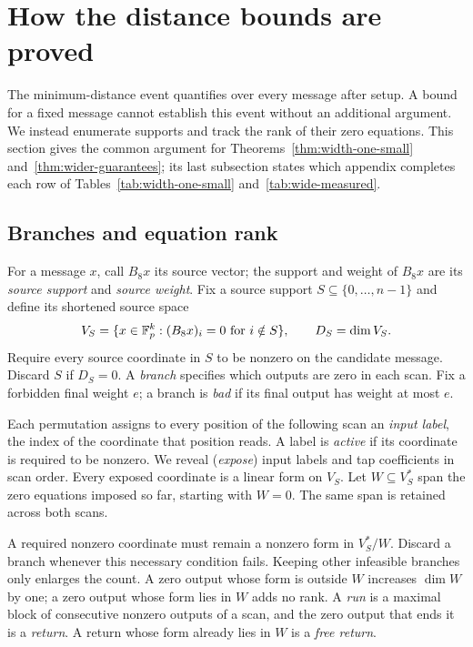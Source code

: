 \section{How the distance bounds are proved}\label{sec:distance-proof}

The minimum-distance event quantifies over every message after setup.
A bound for a fixed message cannot establish this event without an
additional argument. We instead enumerate supports and track the rank
of their zero equations. This section gives the common argument for
Theorems~\ref{thm:width-one-small} and~\ref{thm:wider-guarantees}; its
last subsection states which appendix completes each row of
Tables~\ref{tab:width-one-small} and~\ref{tab:wide-measured}.

\subsection{Branches and equation rank}

For a message $x$, call $B_8x$ its source vector; the support and weight
of $B_8x$ are its \emph{source support} and \emph{source weight}.
Fix a source support $S\subseteq\{0,\ldots,n-1\}$ and define its
shortened source space
\[
 V_S=\{x\in\mathbb F_p^k:(B_8x)_i=0\text{ for }i\notin S\},
 \qquad D_S=\dim V_S.
\]
Require every source coordinate in $S$ to be nonzero on the candidate
message. Discard $S$ if $D_S=0$. A \emph{branch} specifies which outputs
are zero in each scan. Fix a forbidden final weight $e$; a branch is
\emph{bad} if its final output has weight at most $e$.

Each permutation assigns to every position of the following scan an
\emph{input label}, the index of the coordinate that position reads.
A label is \emph{active} if its coordinate is required to be nonzero.
We reveal (\emph{expose}) input labels and tap coefficients in scan
order. Every exposed coordinate is a linear form on $V_S$.
Let $W\subseteq V_S^*$ span the zero equations imposed so far, starting
with $W=0$. The same span is retained across both scans.

A required nonzero coordinate must remain a nonzero form in $V_S^*/W$.
Discard a branch whenever this necessary condition fails. Keeping other
infeasible branches only enlarges the count. A zero output whose form
is outside $W$ increases $\dim W$ by one; a zero output whose form lies
in $W$ adds no rank. A \emph{run} is a maximal block of consecutive
nonzero outputs of a scan, and the zero output that ends it is a
\emph{return}. A return whose form already lies in $W$ is a
\emph{free return}.

